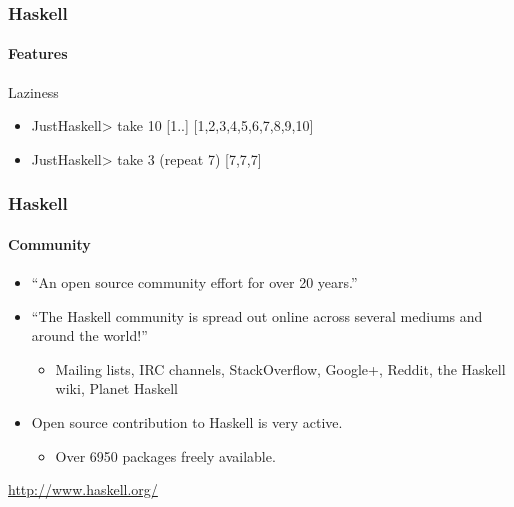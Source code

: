 \documentclass{beamer}
\begin{document}

\begin{frame}[fragile]
  \frametitle{Haskell}
  \framesubtitle{Features}

  \begin{block}{Laziness}
    \begin{itemize}
    \item
      \begin{code}
JustHaskell> take 10 [1..]
[1,2,3,4,5,6,7,8,9,10]
      \end{code}
    \item
      \begin{code}
JustHaskell> take 3 (repeat 7)
[7,7,7]
      \end{code}
    \end{itemize}
  \end{block}
\end{frame}


\begin{frame}
  \frametitle{Haskell}
  \framesubtitle{Community}

  \begin{itemize}
  \item
    ``An open source community effort for over 20 years.''
  \item
    ``The Haskell community is spread out online across several mediums and
    around the world!''
    \begin{itemize}
    \item Mailing lists, IRC channels, StackOverflow, Google+, Reddit,
      the Haskell wiki, Planet Haskell
    \end{itemize}
  \item
    Open source contribution to Haskell is very active.
    \begin{itemize}
    \item
      Over 6950 packages freely available.
    \end{itemize}
  \end{itemize}
  \vfill
  \begin{thebibliography}{Haskell}
    \url{http://www.haskell.org/}
  \end{thebibliography}
\end{frame}

\end{document}
